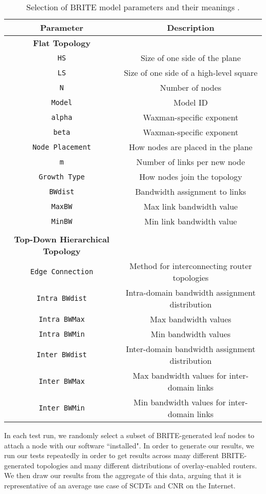 \begin{table}
	\begin{center}
		\begin{tabular}{|c|c|}
			\hline
			\textbf{Parameter} & \textbf{Description} \\
			\hline
			\textbf{Flat Topology} & \\
			\hline
			\texttt{HS} & Size of one side of the plane \\
			\hline
			\texttt{LS} & Size of one side of a high-level square \\
			\hline
			\texttt{N} & Number of nodes \\
			\hline
			\texttt{Model} & Model ID \\
			\hline
			\texttt{alpha} & Waxman-specific exponent \\
			\hline
			\texttt{beta} & Waxman-specific exponent \\
			\hline
			\texttt{Node Placement} & How nodes are placed in the plane \\
			\hline
			\texttt{m} & Number of links per new node \\
			\hline
			\texttt{Growth Type} & How nodes join the topology \\
			\hline
			\texttt{BWdist} & Bandwidth assignment to links \\
			\hline
			\texttt{MaxBW} & Max link bandwidth value \\
			\hline
			\texttt{MinBW} & Min link bandwidth value \\
			\hline
			& \\
			\hline
			\textbf{Top-Down Hierarchical Topology} & \\
			\hline
			\texttt{Edge Connection} & Method for interconnecting router topologies \\
			\hline
			\texttt{Intra BWdist} & Intra-domain bandwidth assignment distribution \\
			\hline
			\texttt{Intra BWMax} & Max bandwidth values \\
			\hline
			\texttt{Intra BWMin} & Min bandwidth values \\
			\hline
			\texttt{Inter BWdist} & Inter-domain bandwidth assignment distribution \\
			\hline
			\texttt{Inter BWMax} & Max bandwidth values for inter-domain links \\
			\hline
			\texttt{Inter BWMin} & Min bandwidth values for inter-domain links \\
			\hline
		\end{tabular}
	\end{center}
	\caption{Selection of BRITE model parameters and their meanings \cite{brite-manual}.}
	\label{tab:brite-params}
\end{table}

In each test run, we randomly select a subset of BRITE-generated leaf nodes to attach a node with our software ``installed". In order to generate our results, we run our tests repeatedly in order to get results across many different BRITE-generated topologies and many different distributions of overlay-enabled routers. We then draw our results from the aggregate of this data, arguing that it is representative of an average use case of SCDTs and CNR on the Internet.